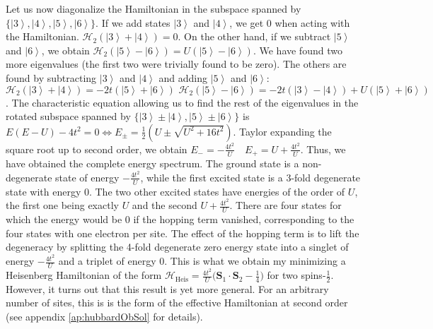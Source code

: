 Let us now diagonalize the Hamiltonian in the subspace spanned by $\{\left| 3 \right\rangle, \left| 4 \right\rangle, \left| 5 \right\rangle, \left| 6 \right\rangle \}$.
If we add states $\left| 3 \right\rangle$ and $\left| 4 \right\rangle $, we get $0$ when acting with the Hamiltonian. 
$
\mathcal{H}_{2} ( \left| 3 \right\rangle + \left| 4 \right\rangle ) = 0
$.
On the other hand, if we subtract $\left| 5 \right\rangle$ and $\left| 6 \right\rangle$, we obtain
$
\mathcal{H}_{2}(\left| 5 \right\rangle -\left| 6 \right\rangle) = U( \left| 5 \right\rangle - \left| 6 \right\rangle)
$.
We have found two more eigenvalues (the first two were trivially found to be zero).
The others are found by subtracting $\left| 3 \right\rangle$ and $\left| 4 \right\rangle $ and adding $\left| 5 \right\rangle$ and $\left| 6 \right\rangle$: 
$\mathcal{H}_{2} ( \left| 3 \right\rangle + \left| 4 \right\rangle ) = -2 t  (\left| 5 \right\rangle + \left| 6 \right\rangle) \,\,
\mathcal{H}_{2}(\left| 5 \right\rangle -\left| 6 \right\rangle) = - 2 t (\left| 3 \right\rangle - \left| 4 \right\rangle ) + U (\left| 5 \right\rangle + \left| 6 \right\rangle) 
$.
The characteristic equation allowing us to find the rest of the eigenvalues in the rotated subspace spanned by $\{\left| 3 \right\rangle \pm \left| 4 \right\rangle, \left| 5 \right\rangle \pm \left| 6 \right\rangle  \}$ is
$
E ( E - U ) - 4 t^2 = 0 \iff E_{\pm} = \frac{1}{2} ( U \pm \sqrt{U^2 + 16 t^2} )
$.
Taylor expanding the square root up to second order, we obtain
$
E_- = -\frac{4t^2}{U} \quad E_+ = U + \frac{4t^2}{U}
$.
Thus, we have obtained the complete energy spectrum.
The ground state is a non-degenerate state of energy $-\frac{4t^2}{U}$, while the first excited state is a 3-fold degenerate state with energy $0$.
The two other excited states have energies of the order of $U$, the first one being exactly $U$ and the second $U + \frac{4t^2}{U}$.
There are four states for which the energy would be 0 if the hopping term vanished, corresponding to the four states with one electron per site.
The effect of the hopping term is to lift the degeneracy by splitting the 4-fold degenerate zero energy state into a singlet of energy $-\frac{4t^2}{U}$ and a triplet of energy $0$.
This is what we obtain my minimizing a Heisenberg Hamiltonian of the form
$
\mathcal{H}_{\text{Heis}} = \frac{4t^2}{U} \big( \bm S_1 \cdot \bm S_2 - \frac{1}{4} \big)
$
for two spins-$\frac{1}{2}$.
However, it turns out that this result is yet more general.
For an arbitrary number of sites, this is is the form of the effective Hamiltonian at second order (see appendix \ref{ap:hubbardObSol} for details).

